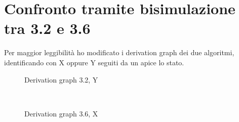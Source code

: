 \documentclass[a4paper]{article}
\begin{document}
\section{Confronto tramite bisimulazione tra 3.2 e 3.6}
Per maggior leggibilità ho modificato i derivation graph dei due algoritmi, identificando con X oppure Y seguiti da un apice lo stato.\\
\begin{figure}[!ht]
\centering
{}
\caption{Derivation graph 3.2, Y} \label{FIG:3.2Eq}
\end{figure}\\
\begin{figure}[!ht]
\centering
{}
\caption{Derivation graph 3.6, X} \label{FIG:3.6Eq}
\end{figure}\\
\newpage
\end{document}

